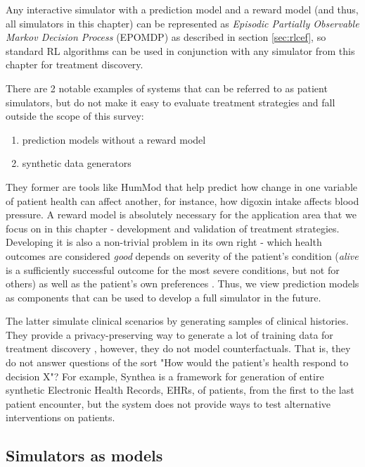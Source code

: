 Any interactive simulator with a prediction model and a reward model (and thus, all simulators in this chapter) can be represented as {\em Episodic Partially Observable Markov Decision Process} (EPOMDP) as described in section \ref{sec:rlcef}, so standard RL algorithms can be used in conjunction with any simulator from this chapter for treatment discovery.

There are 2 notable examples of systems that can be referred to as patient simulators, but do not make it easy to evaluate treatment strategies and fall outside the scope of this survey: 
\begin{enumerate}
    \item prediction models without a reward model
    \item synthetic data generators \cite{datagens}
\end{enumerate}

They former are tools like HumMod \cite{hummod} that help predict how change in one variable of patient health can affect another, for instance, how digoxin intake affects blood pressure.
A reward model is absolutely necessary for the application area that we focus on in this chapter - development and validation of treatment strategies.
Developing it is also a non-trivial problem in its own right - which health outcomes are considered \emph{good} depends on severity of the patient's condition (\emph{alive} is a sufficiently successful outcome for the most severe conditions, but not for others) as well as the patient's own preferences \cite{patpreferences1,patpreferences2}.
Thus, we view prediction models as components that can be used to develop a full simulator in the future.

The latter simulate clinical scenarios by generating samples of clinical histories.
They provide a privacy-preserving way to generate a lot of training data for treatment discovery \cite{privacy1,privacy2,privacy3,privacy4}, however, they do not model counterfactuals. That is, they do not answer questions of the sort "How would the patient's health respond to decision X"? For example, Synthea \cite{synthea} is a framework for generation of entire synthetic Electronic Health Records, EHRs, of patients, from the first to the last patient encounter, but the system does not provide ways to test alternative interventions on patients. 

\subsection{Simulators as models}

